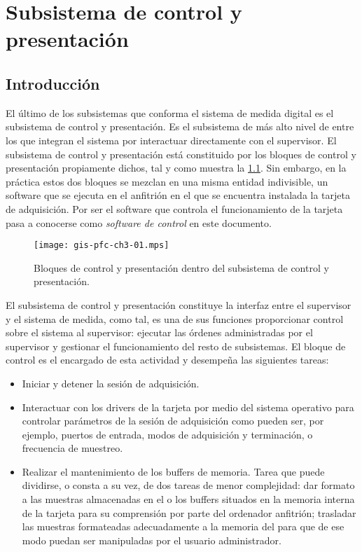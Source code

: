 \chapter{Subsistema de control y presentación}\label{chap:control}

\section{Introducción}

El último de los subsistemas que conforma el sistema de medida digital es
el subsistema de control y presentación. Es el subsistema de más alto nivel
de entre los que integran el sistema por interactuar directamente con el
supervisor. El subsistema de control y presentación está constituido por
los bloques de control y presentación propiamente dichos, tal y como
muestra la \cref{fig:subconpre}. Sin embargo, en la práctica estos dos
bloques se mezclan en una misma entidad indivisible, un software que se
ejecuta en el \pc{} anfitrión en el que se encuentra instalada la tarjeta
de adquisición.  Por ser el software que controla el funcionamiento de la
tarjeta \kpci{} pasa a conocerse como \emph{software de control} en este
documento.

\begin{figure}
	\begin{center}
		\texttt{[image: gis-pfc-ch3-01.mps]}
	\end{center}
	\caption[Subsistema de control y presentación] {Bloques de control
	y presentación dentro del subsistema de control y presentación.}
	\label{fig:subconpre}
\end{figure}

El subsistema de control y presentación constituye la interfaz entre el
supervisor y el sistema de medida, como tal, es una de sus funciones
proporcionar control sobre el sistema al supervisor: ejecutar las órdenes
administradas por el supervisor y gestionar el funcionamiento del resto de
subsistemas. El bloque de control es el encargado de esta actividad y
desempeña las siguientes tareas:

\begin{itemize}
	\item Iniciar y detener la sesión de adquisición.
	\item Interactuar con los drivers de la tarjeta por medio del
		sistema operativo para controlar parámetros de la sesión de
		adquisición como pueden ser, por ejemplo, puertos de
		entrada, modos de adquisición y terminación, o frecuencia
		de muestreo.
	\item Realizar el mantenimiento de los buffers de memoria. Tarea
		que puede dividirse, o consta a su vez, de dos tareas de
		menor complejidad: dar formato a las muestras almacenadas
		en el o los buffers situados en la memoria interna de la
		tarjeta para su comprensión por parte del ordenador
		anfitrión; trasladar las muestras formateadas adecuadamente
		a la memoria del \pc{} para que de ese modo puedan ser
		manipuladas por el usuario administrador.
\end{itemize}

